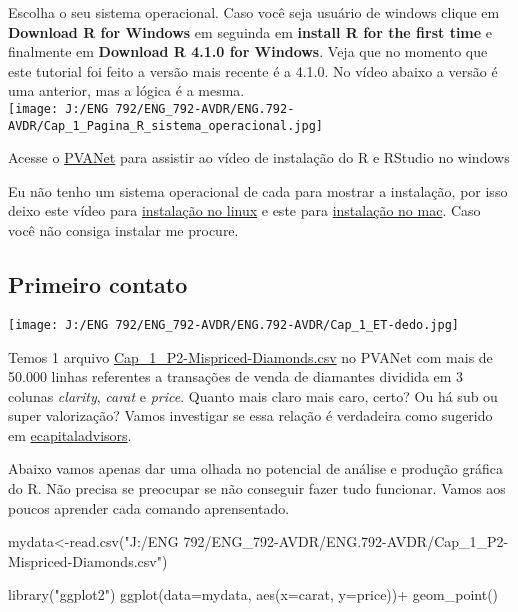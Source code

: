 \documentclass[
]{book}
\newenvironment{Shaded}{\begin{snugshade}}{\end{snugshade}}
\newcommand{\AttributeTok}[1]{\textcolor[rgb]{0.77,0.63,0.00}{#1}}
\newcommand{\FunctionTok}[1]{\textcolor[rgb]{0.00,0.00,0.00}{#1}}
\newcommand{\NormalTok}[1]{#1}
\newcommand{\OtherTok}[1]{\textcolor[rgb]{0.56,0.35,0.01}{#1}}
\newcommand{\SpecialCharTok}[1]{\textcolor[rgb]{0.00,0.00,0.00}{#1}}
\newcommand{\StringTok}[1]{\textcolor[rgb]{0.31,0.60,0.02}{#1}}
\begin{document}
Escolha o seu sistema operacional. Caso você seja usuário de windows clique em \textbf{Download R for Windows} em seguinda em \textbf{install R for the first time} e finalmente em \textbf{Download R 4.1.0 for Windows}. Veja que no momento que este tutorial foi feito a versão mais recente é a 4.1.0. No vídeo abaixo a versão é uma anterior, mas a lógica é a mesma.\\
\texttt{[image: J:/ENG 792/ENG\_792-AVDR/ENG.792-AVDR/Cap\_1\_Pagina\_R\_sistema\_operacional.jpg]}

Acesse o \href{https://www2.cead.ufv.br/sistemas/pvanet/geral/login.php}{PVANet} para assistir ao vídeo de instalação do R e RStudio no windows

Eu não tenho um sistema operacional de cada para mostrar a instalação, por isso deixo este vídeo para \href{https://www.youtube.com/watch?v=np2-FIgzpTg\&ab_channel=AutoDeeDucks}{instalação no linux} e este para \href{https://www.youtube.com/watch?v=LanBozXJjOk\&ab_channel=DataSciencewithTom}{instalação no mac}. Caso você não consiga instalar me procure.

\hypertarget{primeiro-contato}{%
\subsection{Primeiro contato}\label{primeiro-contato}}

\texttt{[image: J:/ENG 792/ENG\_792-AVDR/ENG.792-AVDR/Cap\_1\_ET-dedo.jpg]}

Temos 1 arquivo \href{https://www2.cead.ufv.br/sistemas/pvanet/geral/login.php}{Cap\_1\_P2-Mispriced-Diamonds.csv} no PVANet com mais de 50.000 linhas referentes a transações de venda de diamantes dividida em 3 colunas \emph{clarity}, \emph{carat} e \emph{price}. Quanto mais claro mais caro, certo? Ou há sub ou super valorização? Vamos investigar se essa relação é verdadeira como sugerido em \href{https://ecapitaladvisors.com/blog/finding-mispriced-diamonds/}{ecapitaladvisors}.

Abaixo vamos apenas dar uma olhada no potencial de análise e produção gráfica do R. Não precisa se preocupar se não conseguir fazer tudo funcionar. Vamos aos poucos aprender cada comando aprensentado.

\begin{Shaded}
\begin{Highlighting}[]
\NormalTok{mydata}\OtherTok{\textless{}{-}}\FunctionTok{read.csv}\NormalTok{(}\StringTok{"J:/ENG 792/ENG\_792{-}AVDR/ENG.792{-}AVDR/Cap\_1\_P2{-}Mispriced{-}Diamonds.csv"}\NormalTok{)}

\FunctionTok{library}\NormalTok{(}\StringTok{"ggplot2"}\NormalTok{)}
\FunctionTok{ggplot}\NormalTok{(}\AttributeTok{data=}\NormalTok{mydata, }\FunctionTok{aes}\NormalTok{(}\AttributeTok{x=}\NormalTok{carat, }\AttributeTok{y=}\NormalTok{price))}\SpecialCharTok{+} 
  \FunctionTok{geom\_point}\NormalTok{()}
\end{Highlighting}
\end{Shaded}
\end{document}
